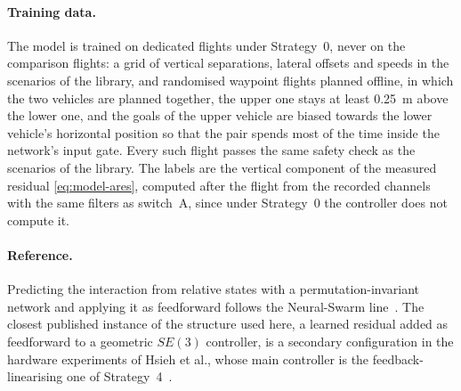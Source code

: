 \paragraph{Training data.} The model is trained on dedicated flights under Strategy~0, never on the
comparison flights: a grid of vertical separations, lateral offsets and speeds in the scenarios of
the library, and randomised waypoint flights planned offline, in which the two vehicles are planned
together, the upper one stays at least \SI{0.25}{\metre} above the lower one, and the goals of the
upper vehicle are biased towards the lower vehicle's horizontal position so that the pair spends most
of the time inside the network's input gate. Every such flight passes the same safety check as the
scenarios of the library. The labels are the vertical component of the measured residual
\eqref{eq:model-ares}, computed after the flight from the recorded channels with the same filters as
switch~A, since under Strategy~0 the controller does not compute it.

\paragraph{Reference.} Predicting the interaction from relative states with a
permutation-invariant network and applying it as feedforward follows the Neural-Swarm
line~\cite{shi2020neuralswarm,shi2022neuralswarm2}. The closest published instance of the structure
used here, a learned residual added as feedforward to a geometric $SE(3)$ controller, is a
secondary configuration in the hardware experiments of Hsieh et al., whose main controller is the
feedback-linearising one of Strategy~4~\cite{hsieh2026flatness}.

